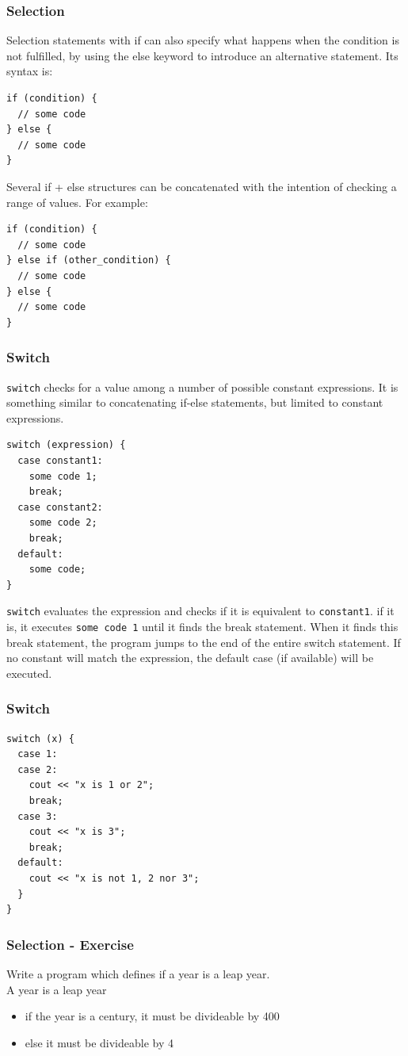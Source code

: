 \begin{frame}[fragile]
  \frametitle{Selection}
  {\scriptsize
  Selection statements with if can also specify what happens when the condition is not fulfilled,
  by using the else keyword to introduce an alternative statement. Its syntax is:
\begin{lstlisting}
if (condition) {
  // some code
} else {
  // some code
}
\end{lstlisting}
Several if + else structures can be concatenated with the intention of checking a range of values. For example:
\begin{lstlisting}
if (condition) {
  // some code
} else if (other_condition) {
  // some code
} else {
  // some code
}
\end{lstlisting}
}
\end{frame}

\begin{frame}[fragile]
  \frametitle{Switch}
  {\scriptsize
  \verb|switch| checks for a value among a number of possible constant expressions.
  It is something similar to concatenating if-else statements, but limited to constant expressions. 
  \begin{lstlisting}
switch (expression) {
  case constant1:
    some code 1;
    break;
  case constant2:
    some code 2;
    break;
  default:
    some code;
}
  \end{lstlisting}
  \verb|switch| evaluates the expression and checks if it is equivalent to
  \verb|constant1|. if it is, it executes \verb|some code 1| until it finds
  the break statement. When it finds this break statement, the program jumps
  to the end of the entire switch statement. If no constant will match the
  expression, the default case (if available) will be executed.
  }
\end{frame}

\begin{frame}[fragile]
  \frametitle{Switch}
  {\scriptsize
  \begin{lstlisting}
switch (x) {
  case 1:
  case 2:
    cout << "x is 1 or 2";
    break;
  case 3:
    cout << "x is 3";
    break;
  default:
    cout << "x is not 1, 2 nor 3";
  }
}
  \end{lstlisting}
  }
\end{frame}

\begin{frame}[fragile]
  \frametitle{Selection - Exercise}
  \begin{exercise}
  Write a program which defines if a year is a leap year.\\
  A year is a leap year
  \begin{itemize}
  \item if the year is a century, it must be divideable by 400
  \item else it must be divideable by 4
  \end{itemize}
  \end{exercise}
\end{frame}

